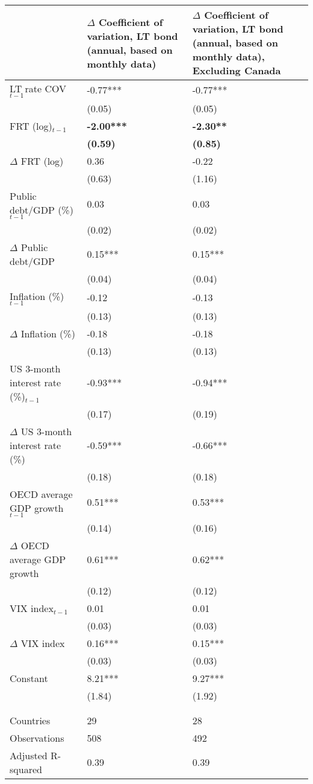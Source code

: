 {\tiny
\begin{tabular}{lp{2cm}p{2cm}}
  \hline
 & $\Delta$ Coefficient of variation, LT bond (annual, based on monthly data) & $\Delta$ Coefficient of variation, LT bond (annual, based on monthly data), \textbf{Excluding Canada} \\ 
  \hline
LT rate COV$_{t-1}$ & -0.77*** & -0.77*** \\ 
   & (0.05) & (0.05) \\ 
  FRT (log)$_{t-1}$ & \textbf{-2.00***} & \textbf{-2.30**} \\ 
   & \textbf{(0.59)} & \textbf{(0.85)} \\ 
  $\Delta$ FRT (log) & 0.36 & -0.22 \\ 
   & (0.63) & (1.16) \\ 
  Public debt/GDP (\%)$_{t-1}$ & 0.03 & 0.03 \\ 
   & (0.02) & (0.02) \\ 
  $\Delta$ Public debt/GDP & 0.15*** & 0.15*** \\ 
   & (0.04) & (0.04) \\ 
  Inflation (\%) $_{t-1}$ & -0.12 & -0.13 \\ 
   & (0.13) & (0.13) \\ 
  $\Delta$ Inflation (\%) & -0.18 & -0.18 \\ 
   & (0.13) & (0.13) \\ 
  US 3-month interest rate (\%)$_{t-1}$ & -0.93*** & -0.94*** \\ 
   & (0.17) & (0.19) \\ 
  $\Delta$ US 3-month interest rate (\%) & -0.59*** & -0.66*** \\ 
   & (0.18) & (0.18) \\ 
  OECD average GDP growth$_{t-1}$ & 0.51*** & 0.53*** \\ 
   & (0.14) & (0.16) \\ 
  $\Delta$ OECD average GDP growth & 0.61*** & 0.62*** \\ 
   & (0.12) & (0.12) \\ 
  VIX index$_{t-1}$ & 0.01 & 0.01 \\ 
   & (0.03) & (0.03) \\ 
  $\Delta$ VIX index & 0.16*** & 0.15*** \\ 
   & (0.03) & (0.03) \\ 
  Constant & 8.21*** & 9.27*** \\ 
   & (1.84) & (1.92) \\ 
   &  &  \\ 
   &  &  \\ 
  Countries & 29 & 28 \\ 
  Observations & 508 & 492 \\ 
  Adjusted R-squared & 0.39 & 0.39 \\ 
   \hline
\end{tabular}
}

